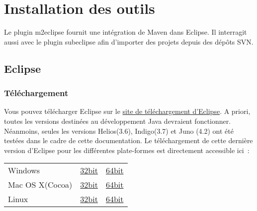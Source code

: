 % 
\chapter{Installation des outils}

Le plugin m2eclipse fournit une intégration de Maven dans Eclipse. Il interragit aussi avec le plugin subeclipse afin d'importer des projets depuis des dépôts SVN.


\section{Eclipse}
\subsection{Téléchargement}
Vous pouvez télécharger Eclipse sur le 
\href{http://www.eclipse.org/downloads/}{site de téléchargement d'Eclipse}. A priori, toutes les versions destinées au développement Java devraient fonctionner. Néanmoins, seules les versions Helios(3.6), Indigo(3.7) et Juno (4.2) ont été testées dans le cadre de cette documentation. Le téléchargement de cette dernière version d'Eclipse pour les différentes plate-formes est directement accessible ici~:\\

\begin{center}
\begin{tabular}[!t]{lll}
Windows&
\href{http://www.eclipse.org/downloads/download.php?file=/technology/epp/downloads/release/juno/SR1/eclipse-jee-juno-SR1-win32.zip}{32bit}&
\href{http://www.eclipse.org/downloads/download.php?file=/technology/epp/downloads/release/juno/SR1/eclipse-jee-juno-SR1-win32-x86_64.zip}{64bit}\\
Mac OS X(Cocoa)&
\href{http://www.eclipse.org/downloads/download.php?file=/technology/epp/downloads/release/juno/SR1/eclipse-jee-juno-SR1-macosx-cocoa.tar.gz}{32bit}&
\href{http://www.eclipse.org/downloads/download.php?file=/technology/epp/downloads/release/juno/SR1/eclipse-jee-juno-SR1-macosx-cocoa-x86_64.tar.gz}{64bit}\\
Linux&
\href{http://www.eclipse.org/downloads/download.php?file=/technology/epp/downloads/release/juno/SR1/eclipse-jee-juno-SR1-linux-gtk.tar.gz}{32bit}&
\href{http://www.eclipse.org/downloads/download.php?file=/technology/epp/downloads/release/juno/SR1/eclipse-jee-juno-SR1-linux-gtk-x86_64.tar.gz}{64bit}\\
\end{tabular}
\end{center}


